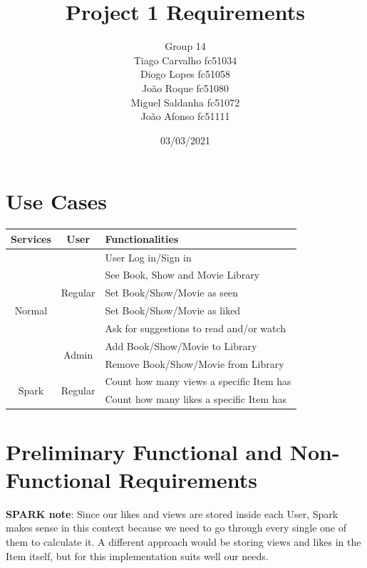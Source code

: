 \documentclass{article}
\title{Project 1 Requirements}
\author{Group 14 \\
Tiago Carvalho fc51034 \\
Diogo Lopes fc51058 \\
João Roque fc51080 \\
Miguel Saldanha fc51072 \\
João Afonso fc51111 \\
}
\date{03/03/2021}
\begin{document}
\maketitle

\section{Use Cases}
  \begin{table}[H]
    \centering
    \begin{tabular}{c|c|l} 
      Services & User & Functionalities \\ \hline
      \multirow{7}{*}{ Normal }
        & \multirow{5}{*}{ Regular } 
          & User Log in/Sign in \\
        & & See Book, Show and Movie Library \\
        & & Set Book/Show/Movie as seen \\
        & & Set Book/Show/Movie as liked \\ 
        & & Ask for suggestions to read and/or watch \\ \cline{2-3}
      & \multirow{2}{*}{ Admin } 
          & Add Book/Show/Movie to Library \\
        & & Remove Book/Show/Movie from Library \\ \hline
      \multirow{2}{*}{ Spark }
        & \multirow{2}{*}{ Regular }
          & Count how many views a specific Item has \\
        & & Count how many likes a specific Item has \\
    \end{tabular}
  \end{table}

\section{Preliminary Functional and Non-Functional Requirements}
\textbf{SPARK note}: Since our likes and views are stored inside each User, Spark makes sense in this context because we need to go through every single one of them to calculate it. A different approach would be storing views and likes in the Item itself, but for this implementation suits well our needs.
  
\end{document}
